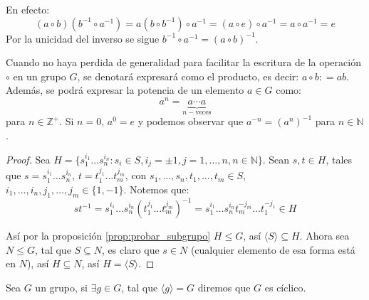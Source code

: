 \begin{enefecto}
	En efecto:
	\begin{equation*}
		(a \circ b)(b^{-1} \circ a^{-1}) = a(b \circ b^{-1}) \circ a^{-1} = (a \circ e) \circ a^{-1} = a \circ a^{-1} = e
	\end{equation*}
	Por la unicidad del inverso se sigue $b^{-1} \circ a^{-1} = (a \circ b)^{-1}$.
\end{enefecto}

Cuando no haya perdida de generalidad para facilitar la escritura de la operación $\circ$ en un grupo $G$, se denotará expresará como el producto, es decir: $a \circ b: = a b$. Además, se podrá expresar la potencia de un elemento $a \in G$ como:
\begin{equation*}
	a^n = \underbrace{a \cdots a}_{n-\text{veces}}
\end{equation*}
para $n \in \mathbb{Z} ^ {+}$. Si $n = 0$, $a^0 = e$ y podemos observar que $a^{-n} = (a^n)^{-1}$ para $n \in \mathbb{N}$.


\begin{proof}
	Sea $H = \{ s_1^{i_1} \dots s_n^{i_n} : s_i \in S, i_j = \pm 1, j=1,\dots,n, n \in \mathbb{N} \}$. Sean $s, t \in H$, tales que $s = s_1^{i_1} \dots s_n^{i_n}$, $t = t_1^{j_1} \dots t_m^{j_m}$, con $s_1, \dots, s_n, t_1, \dots, t_m \in S$, $i_1, \dots, i_n, j_1, \dots, j_m \in \{1, -1\}$. Notemos que:
	\begin{equation*}
		st^{-1} = s_1^{i_1} \dots s_n^{i_n} (t_1^{j_1} \dots t_m^{j_m})^{-1} = s_1^{i_1} \dots s_n^{i_n} t_m^{-j_m} \dots t_1^{-j_1} \in H
	\end{equation*}

	Así por la proposición \ref{prop:probar_subgrupo} $H \le G$, así $\langle S \rangle \subseteq H$. Ahora sea $N \le G$, tal que $S \subseteq N$, es claro que $s \in N$ (cualquier elemento de esa forma está en $N$), así $H \subseteq N$, así $H = \langle S \rangle$.
\end{proof}

\begin{defi}
	Sea $G$ un grupo, si $\exists g \in G$, tal que $\langle g \rangle = G$ diremos que $G$ es cíclico.
\end{defi}

